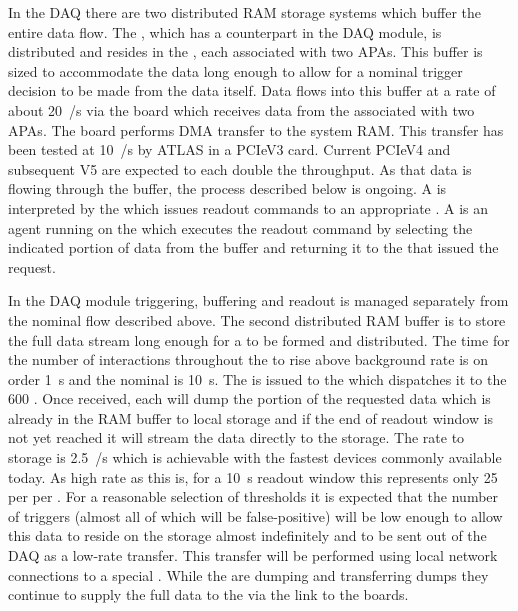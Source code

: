 In the   DAQ there are two distributed RAM
storage systems which buffer the entire data flow. 
The , which has a counterpart in the  DAQ
module, is distributed and resides in the , each
associated with two APAs. 
This buffer is sized to accommodate the data long enough to allow for
a nominal trigger decision to be made from the data itself.
Data flows into this buffer at a rate of about \SI{20}{\GB/\s} via the
 board which receives data from the 
associated with two APAs. 
The  board performs DMA transfer to the system RAM. 
This transfer has been tested at \SI{10}{\GB/\s} by ATLAS in a PCIeV3
card. 
Current PCIeV4 and subsequent V5 are expected to each double the
throughput.
As that data is flowing through the buffer, the 
process described below is ongoing.
A  is interpreted by the  which issues
readout commands to an appropriate . 
A  is an agent running on the  which
executes the readout command by selecting the indicated portion of
data from the buffer and returning it to the  that issued
the request.

In the  DAQ module  triggering, buffering and
readout is managed separately from the nominal flow described above. 
The second distributed RAM buffer is to store the full data stream
long enough for a   to be formed and
distributed. 
The time for the number of  interactions throughout the
  to rise above background rate is on order
\SI{1}{\s} and the nominal   is
\SI{10}{\s}. 
The   is issued to the  which
dispatches it to the 600 . 
Once received, each  will dump the portion of the requested
data which is already in the RAM buffer to local  storage
and if the end of readout window is not yet reached it will stream the
data directly to the  storage.
The rate to  storage is \SI{2.5}{\GB/\s} which is
achievable with the fastest devices commonly available today. 
As high rate as this is, for a \SI{10}{\s}  readout window
this represents only \SI{25}{\GB} per  per .
For a reasonable selection of thresholds it is expected that the
number of  triggers (almost all of which will be
false-positive) will be low enough to allow this data to reside on the
 storage almost indefinitely and to be sent out of the DAQ
as a low-rate transfer.
This transfer will be performed using local network connections to a
special  .
While the  are dumping and transferring  dumps
they continue to supply the full data to the  via the link
to the  boards.

